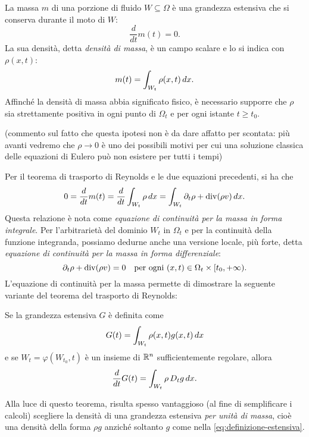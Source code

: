 La massa $m$ di una porzione di fluido $W \subseteq \Omega$ è una
grandezza estensiva che si conserva durante il moto di $W$:
\[
\frac{d}{dt} m(t) = 0.
\]
La sua densità, detta \emph{densità di massa}, è un campo scalare
e lo si indica con $\rho(x,t)$:
\[
m(t) = \int_{W_t} \rho(x,t) \, dx.
\]
Affinché la densità di massa abbia significato fisico, è necessario
supporre che $\rho$ sia strettamente positiva in ogni punto di $\Omega_t$
e per ogni istante $t \geq t_0$.

(commento sul fatto che questa ipotesi non è da dare affatto per scontata:
più avanti vedremo che $\rho \to 0$ è uno dei possibili
motivi per cui una soluzione classica delle equazioni di Eulero
può non esistere per tutti i tempi)

Per il teorema di trasporto di Reynolds e le due equazioni precedenti,
si ha che
\begin{equation} \label{eq:continuita-forma-integrale}
0
= \frac{d}{dt} m(t)
= \frac{d}{dt} \int_{W_t} \rho \, dx
= \int_{W_t} \partial_t \rho + \operatorname{div}(\rho v) \, dx.
\end{equation}
Questa relazione è nota come \emph{equazione di continuità
per la massa in forma integrale}.
Per l'arbitrarietà del dominio $W_t$ in $\Omega_t$
e per la continuità della funzione integranda,
possiamo dedurne anche una versione locale, più forte,
detta \emph{equazione di continuità per la massa in forma differenziale}:
\begin{equation} \label{eq:continuita-forma-differenziale}
\partial_t \rho + \operatorname{div}(\rho v) = 0
\quad \text{per ogni $(x,t) \in \Omega_t \times [t_0,+\infty)$.}
\end{equation}
L'equazione di continuità per la massa permette di
dimostrare la seguente variante del teorema del trasporto di Reynolds:
\begin{teor} \label{teor:reynolds-per-unita-di-massa}
Se la grandezza estensiva $G$ è definita come
\[
G(t) = \int_{W_t} \rho(x,t) g(x,t) \, dx
\]
e se $W_t = \varphi(W_{t_0},t)$ è un insieme di $\mathbb{R}^n$ sufficientemente
regolare, allora
\[
\frac{d}{dt} G(t) = \int_{W_t} \rho \, D_t g \, dx.
\]
\end{teor}

\noindent Alla luce di questo teorema, risulta spesso vantaggioso
(al fine di semplificare i calcoli) scegliere la densità di
una grandezza estensiva \emph{per unità di massa}, cioè
una densità della forma $\rho g$ anziché soltanto $g$ come nella
\eqref{eq:definizione-estensiva}.

